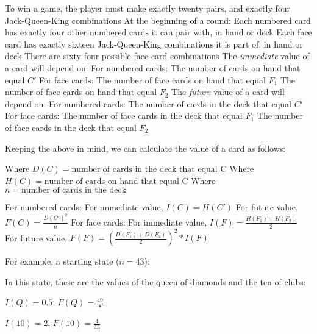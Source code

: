 \documentclass{article}
\begin{document}
\begin{outline}
  \1 To win a game, the player must make exactly twenty pairs, and exactly four Jack-Queen-King combinations
  \1 At the beginning of a round:
    \2 Each numbered card has exactly four other numbered cards it can pair with, in hand or deck
    \2 Each face card has exactly sixteen Jack-Queen-King combinations it is part of, in hand or deck
    \2 There are sixty four possible face card combinations
  \1 The \emph{immediate} value of a card will depend on:
    \2 For numbered cards:
      \3 The number of cards on hand that equal $C'$
    \2 For face cards:
      \3 The number of face cards on hand that equal $F_1$
      \3 The number of face cards on hand that equal $F_2$
  \1 The \emph{future} value of a card will depend on:
    \2 For numbered cards:
      \3 The number of cards in the deck that equal $C'$
    \2 For face cards:
      \3 The number of face cards in the deck that equal $F_1$
      \3 The number of face cards in the deck that equal $F_2$
\end{outline}

Keeping the above in mind, we can calculate the value of a card as follows:

\begin{outline}
  \1 Where $D(C) = \text{number of cards in the deck that equal C}$
  \1 Where $H(C) = \text{number of cards on hand that equal C}$
  \1 Where $n = \text{number of cards in the deck}$
\end{outline}

\begin{outline}
  \1 For numbered cards:
    \2 For immediate value, $I(C) = H(C')$
    \2 For future value, $F(C) = \frac{D(C')^2}{n}$
  \1 For face cards:
    \2 For immediate value, $I(F) = \frac{H(F_1) + H(F_2)}{2}$
    \2 For future value, $F(F) = (\frac{D(F_1) + D(F_2)}{2})^2 * I(F)$
\end{outline}

For example, a starting state ($n = 43$):

\vspace{3mm}


\vspace{3mm}

In this state, these are the values of the queen of diamonds and the ten of clubs:

$I(Q) = 0.5$, $F(Q) = \frac{49}{8}$

$I(10) = 2$, $F(10) = \frac{4}{43}$
\end{document}
